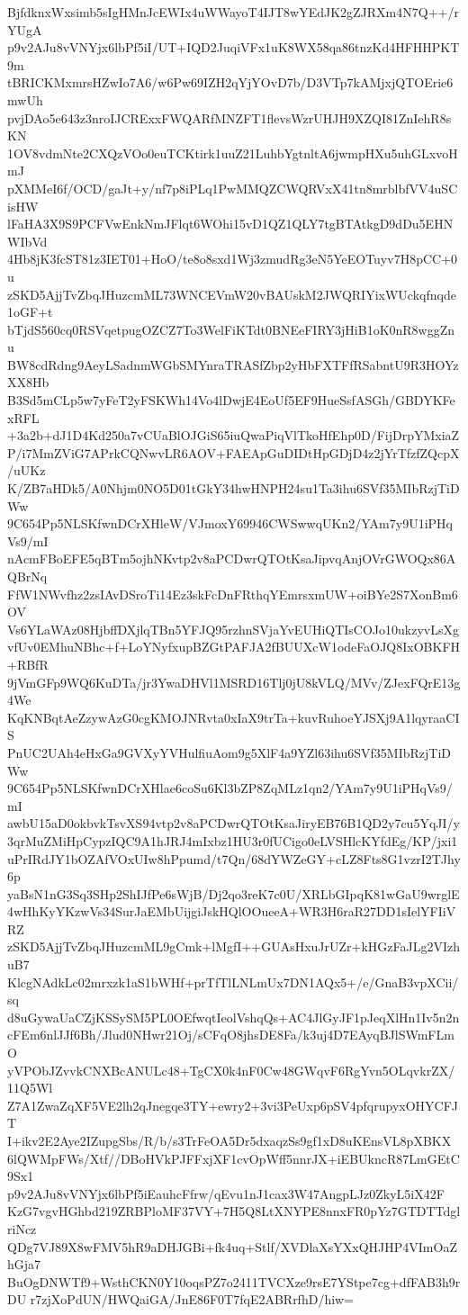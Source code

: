 BjfdknxWxsimb5sIgHMnJcEWIx4uWWayoT4IJT8wYEdJK2gZJRXm4N7Q++/rYUgA
p9v2AJu8vVNYjx6lbPf5iI/UT+IQD2JuqiVFx1uK8WX58qa86tnzKd4HFHHPKT9m
tBRICKMxmrsHZwIo7A6/w6Pw69IZH2qYjYOvD7b/D3VTp7kAMjxjQTOErie6mwUh
pvjDAo5e643z3nroIJCRExxFWQARfMNZFT1flevsWzrUHJH9XZQI81ZnIehR8sKN
1OV8vdmNte2CXQzVOo0euTCKtirk1uuZ21LuhbYgtnltA6jwmpHXu5uhGLxvoHmJ
pXMMeI6f/OCD/gaJt+y/nf7p8iPLq1PwMMQZCWQRVxX41tn8mrblbfVV4uSCisHW
lFaHA3X9S9PCFVwEnkNmJFlqt6WOhi15vD1QZ1QLY7tgBTAtkgD9dDu5EHNWIbVd
4Hb8jK3fcST81z3IET01+HoO/te8o8sxd1Wj3zmudRg3eN5YeEOTuyv7H8pCC+0u
zSKD5AjjTvZbqJHuzcmML73WNCEVmW20vBAUskM2JWQRIYixWUckqfnqde1oGF+t
bTjdS560cq0RSVqetpugOZCZ7To3WelFiKTdt0BNEeFIRY3jHiB1oK0nR8wggZnu
BW8cdRdng9AeyLSadnmWGbSMYnraTRASfZbp2yHbFXTFfRSabntU9R3HOYzXX8Hb
B3Sd5mCLp5w7yFeT2yFSKWh14Vo4lDwjE4EoUf5EF9HueSsfASGh/GBDYKFexRFL
+3a2b+dJ1D4Kd250a7vCUaBlOJGiS65iuQwaPiqVlTkoHfEhp0D/FijDrpYMxiaZ
P/i7MmZViG7APrkCQNwvLR6AOV+FAEApGuDIDtHpGDjD4z2jYrTfzfZQcpX/uUKz
K/ZB7aHDk5/A0Nhjm0NO5D01tGkY34hwHNPH24su1Ta3ihu6SVf35MIbRzjTiDWw
9C654Pp5NLSKfwnDCrXHleW/VJmoxY69946CWSwwqUKn2/YAm7y9U1iPHqVs9/mI
nAcmFBoEFE5qBTm5ojhNKvtp2v8aPCDwrQTOtKsaJipvqAnjOVrGWOQx86AQBrNq
FfW1NWvfhz2zsIAvDSroTi14Ez3skFcDnFRthqYEmrsxmUW+oiBYe2S7XonBm6OV
Vs6YLaWAz08HjbffDXjlqTBn5YFJQ95rzhnSVjaYvEUHiQTIsCOJo10ukzyvLsXg
vfUv0EMhuNBhc+f+LoYNyfxupBZGtPAFJA2fBUUXcW1odeFaOJQ8IxOBKFH+RBfR
9jVmGFp9WQ6KuDTa/jr3YwaDHVl1MSRD16Tlj0jU8kVLQ/MVv/ZJexFQrE13g4We
KqKNBqtAeZzywAzG0cgKMOJNRvta0xIaX9trTa+kuvRuhoeYJSXj9A1lqyraaCIS
PnUC2UAh4eHxGa9GVXyYVHulfiuAom9g5XlF4a9YZl63ihu6SVf35MIbRzjTiDWw
9C654Pp5NLSKfwnDCrXHlae6coSu6Kl3bZP8ZqMLz1qn2/YAm7y9U1iPHqVs9/mI
awbU15aD0okbvkTsvXS94vtp2v8aPCDwrQTOtKsaJiryEB76B1QD2y7cu5YqJI/y
3qrMuZMiHpCypzIQC9A1hJRJ4mIxbz1HU3r0fUCigo0eLVSHlcKYfdEg/KP/jxi1
uPrIRdJY1bOZAfVOxUIw8hPpumd/t7Qn/68dYWZeGY+cLZ8Fts8G1vzrI2TJhy6p
yaBsN1nG3Sq3SHp2ShIJfPe6sWjB/Dj2qo3reK7c0U/XRLbGIpqK81wGaU9wrglE
4wHhKyYKzwVs34SurJaEMbUijgiJskHQlOOueeA+WR3H6raR27DD1sIelYFIiVRZ
zSKD5AjjTvZbqJHuzcmML9gCmk+lMgfI++GUAsHxuJrUZr+kHGzFaJLg2VIzhuB7
KlcgNAdkLc02mrxzk1aS1bWHf+prTfTlLNLmUx7DN1AQx5+/e/GnaB3vpXCii/sq
d8uGywaUaCZjKSSySM5PL0OEfwqtIeolVshqQs+AC4JlGyJF1pJeqXlHn1Iv5n2n
cFEm6nlJJf6Bh/Jlud0NHwr21Oj/sCFqO8jhsDE8Fa/k3uj4D7EAyqBJlSWmFLmO
yVPObJZvvkCNXBcANULc48+TgCX0k4nF0Cw48GWqvF6RgYvn5OLqvkrZX/11Q5Wl
Z7A1ZwaZqXF5VE2lh2qJnegqe3TY+ewry2+3vi3PeUxp6pSV4pfqrupyxOHYCFJT
I+ikv2E2Aye2IZupgSbs/R/b/s3TrFeOA5Dr5dxaqzSs9gf1xD8uKEnsVL8pXBKX
6lQWMpFWs/Xtf//DBoHVkPJFFxjXF1cvOpWff5nnrJX+iEBUkncR87LmGEtC9Sx1
p9v2AJu8vVNYjx6lbPf5iEauhcFfrw/qEvu1nJ1cax3W47AngpLJz0ZkyL5iX42F
KzG7vgvHGhbd219ZRBPloMF37VY+7H5Q8LtXNYPE8nnxFR0pYz7GTDTTdglriNcz
QDg7VJ89X8wFMV5hR9aDHJGBi+fk4uq+Stlf/XVDlaXsYXxQHJHP4VImOaZhGja7
BuOgDNWTf9+WsthCKN0Y10oqsPZ7o2411TVCXze9rsE7YStpe7cg+dfFAB3h9rDU
r7zjXoPdUN/HWQaiGA/JnE86F0T7fqE2ABRrfhD/hiw=
